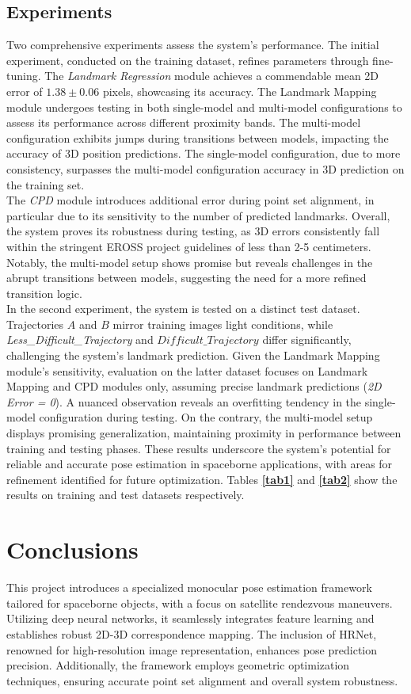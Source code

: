 \documentclass[conference]{IEEEtran}
\begin{document}
\subsection{Experiments}
Two comprehensive experiments assess the system's performance. The initial experiment, conducted on the training dataset, refines parameters through fine-tuning. The \textit{Landmark Regression} module achieves a commendable mean 2D error of $1.38 \pm 0.06$ pixels, showcasing its accuracy. The Landmark Mapping module undergoes testing in both single-model and multi-model configurations to assess its performance across different proximity bands. The multi-model configuration exhibits jumps during transitions between models, impacting the accuracy of 3D position predictions. The single-model configuration, due to more consistency, surpasses the multi-model configuration accuracy in 3D prediction on the training set.\\
The \textit{CPD} module introduces additional error during point set alignment, in particular due to its sensitivity to the number of predicted landmarks. Overall, the system proves its robustness during testing, as 3D errors consistently fall within the stringent EROSS project guidelines of less than 2-5 centimeters. Notably, the multi-model setup shows promise but reveals challenges in the abrupt transitions between models, suggesting the need for a more refined transition logic.\\
In the second experiment, the system is tested on a distinct test dataset. Trajectories \textit{$A$} and \textit{$B$} mirror training images light conditions, while \textit{Less\_Difficult\_Trajectory} and \textit{$Difficult\_Trajectory$} differ significantly, challenging the system's landmark prediction. Given the Landmark Mapping module's sensitivity, evaluation on the latter dataset focuses on Landmark Mapping and CPD modules only, assuming precise landmark predictions (\textit{2D Error = 0}). A nuanced observation reveals an overfitting tendency in the single-model configuration during testing. On the contrary, the multi-model setup displays promising generalization, maintaining proximity in performance between training and testing phases. These results underscore the system's potential for reliable and accurate pose estimation in spaceborne applications, with areas for refinement identified for future optimization. Tables \textbf{\ref{tab1}} and \textbf{\ref{tab2}} show the results on training and test datasets respectively.

\section{Conclusions}
This project introduces a specialized monocular pose estimation framework tailored for spaceborne objects, with a focus on satellite rendezvous maneuvers. Utilizing deep neural networks, it seamlessly integrates feature learning and establishes robust 2D-3D correspondence mapping. The inclusion of HRNet, renowned for high-resolution image representation, enhances pose prediction precision. Additionally, the framework employs geometric optimization techniques, ensuring accurate point set alignment and overall system robustness.
\end{document}
